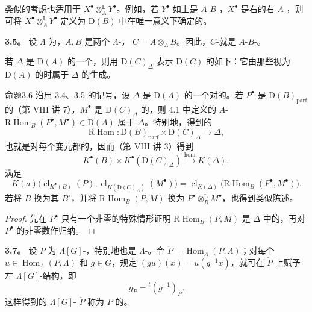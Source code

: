 类似的考虑也适用于 $X^\bullet\otimes_A^{\mathrm L}Y^\bullet$。例如，若 $Y^\bullet$ 如上是 $A$-$B$-，$X^\bullet$ 是右的右 $A$-，则可将 $X^\bullet\otimes_A^{\mathrm L}Y^\bullet$ 定义为 $\mathrm D(B)$ 中在唯一意义下确定的。

\textbf{3.5。} 设 $\Lambda$ 为，$A,B$ 是两个 $\Lambda$-，
$C=A\otimes_\Lambda B$。因此，$C$-就是 $A$-$B$-。

若 $\Delta$ 是 $\mathrm D(A)$ 的一个，则用 $\mathrm D(C)_\Delta$ 表示 $\mathrm D(C)$ 的如下：它由那些视为 $\mathrm D(A)$ 的时属于 $\Delta$ 的生成。

\begin{SGAresult}{命题}{3.6}
沿用 3.4、3.5 的记号，设 $\Delta$ 是 $\mathrm D(A)$ 的一个对的。若 $P^\bullet$ 是 $\mathrm D(B)_{\mathrm{parf}}$ 的（第 VIII 讲 7），$M^\bullet$ 是 $\mathrm D(C)_\Delta$ 的，则 4.1 中定义的 $A$- $\mathrm R\operatorname{Hom}_B(P^\bullet,M^\bullet)\in\mathrm D(A)$ 属于 $\Delta$。特别地，得到的
\[
\mathrm R\operatorname{Hom}:\mathrm D(B)_{\mathrm{parf}}\times\mathrm D(C)_\Delta\longrightarrow\Delta,\tag{3.6.1}
\]
也就是对每个变元都的，因而（第 VIII 讲 3）得到
\[
K^\bullet(B)\times K^\bullet(\mathrm D(C)_\Delta)
\xrightarrow{\operatorname{hom}}K(\Delta),\tag{3.6.2}
\]
满足
\[
K(a)\bigl(\operatorname{cl}_{K^\bullet(B)}(P),
\operatorname{cl}_{K(\mathrm D(C)_\Delta)}(M^\bullet)\bigr)
=\operatorname{cl}_{K(\Delta)}\bigl(\mathrm R\operatorname{Hom}_B(P^\bullet,M^\bullet)\bigr).
\tag{3.6.3}
\]
若将 $B$ 换为其 $B^\circ$，并将 $\mathrm R\operatorname{Hom}_B(P,M)$ 换为 $P^\bullet\otimes_B^{\mathrm L}M^\bullet$，也得到类似陈述。
\end{SGAresult}
\begin{proof}
先在 $P^\bullet$ 只有一个非零的特殊情形证明 $\mathrm R\operatorname{Hom}_B(P,M)$ 是 $\Delta$ 中的，再对 $P^\bullet$ 的非零数作归纳。
\end{proof}
\textbf{3.7。} 设 $P$ 为 $\Lambda[G]$-，特别地也是 $\Lambda$-。令 $\check P=\operatorname{Hom}_\Lambda(P,\Lambda)$；对每个 $u\in\operatorname{Hom}_\Lambda(P,\Lambda)$ 和 $g\in G$，规定
$(gu)(x)=u(g^{-1}x)$，就可在 $\check P$ 上赋予左 $\Lambda[G]$-结构，即
\[
g_{\check P}={}^t(g^{-1})_P.\tag{3.7.1}
\]
这样得到的 $\Lambda[G]$- $\check P$ 称为 $P$ 的。

